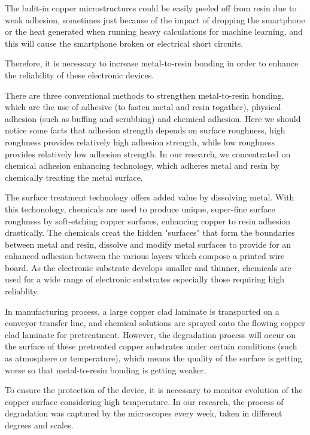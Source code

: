 \documentclass[10pt,twocolumn,letterpaper]{article}
\begin{document}
The bulit-in copper microstructures could be easily peeled off from resin due to weak adhesion, sometimes just because of the impact of dropping the smartphone or the heat generated when running heavy calculations for machine learning, and this will cause the smartphone broken or electrical short circuits.

Therefore, it is necessary to increase metal-to-resin bonding in order to enhance the reliability of these electronic devices.

There are three conventional methods to strengthen metal-to-resin bonding, which are the use of adhesive (to fasten metal and resin togather), physical adhesion (such as buffing and scrubbing) and chemical adhesion.
Here we should notice some facts that adhesion strength depends on surface roughness, high roughness provides relatively high adhesion strength, while low roughness provides relatively low adhesion strength.
In our research, we concentrated on chemical adhesion enhancing technology, which adheres metal and resin by chemically treating the metal surface.

The surface treatment technology offers added value by dissolving metal.
With this techonology, chemicals are used to produce unique, super-fine surface roughness by soft-etching copper surfaces, enhancing copper to resin adhesion drastically.
The chemicals creat the hidden "surfaces" that form the boundaries between metal and resin, dissolve and modify metal surfaces to provide for an enhanced adhesion between the various layers which compose a printed wire board. 
As the electronic substrate develops smaller and thinner, chemicals are used for a wide range of electronic substrates especially those requiring high reliablity. 

In manufacturing process, a large copper clad laminate is transported on a conveyor transfer line, and chemical solutions are sprayed onto the flowing copper clad laminate for pretreatment.
However, the degradation process will occur on the surface of these pretreated copper substrates under certain conditions (such as atmosphere or temperature), which means the quality of the surface is getting worse so that metal-to-resin bonding is getting weaker.

To ensure the protection of the device, it is necessary to monitor evolution of the copper surface considering high temperature.
In our research, the process of degradation was captured by the microscopes every week, taken in different degrees and scales.
\end{document}
